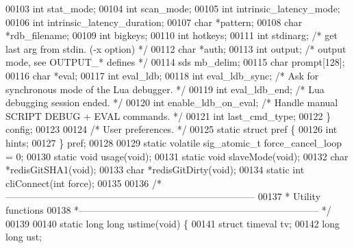\begin{DoxyCode}
00103     \textcolor{keywordtype}{int} stat\_mode;
00104     \textcolor{keywordtype}{int} scan\_mode;
00105     \textcolor{keywordtype}{int} intrinsic\_latency\_mode;
00106     \textcolor{keywordtype}{int} intrinsic\_latency\_duration;
00107     \textcolor{keywordtype}{char} *pattern;
00108     \textcolor{keywordtype}{char} *rdb\_filename;
00109     \textcolor{keywordtype}{int} bigkeys;
00110     \textcolor{keywordtype}{int} hotkeys;
00111     \textcolor{keywordtype}{int} stdinarg; \textcolor{comment}{/* get last arg from stdin. (-x option) */}
00112     \textcolor{keywordtype}{char} *auth;
00113     \textcolor{keywordtype}{int} output; \textcolor{comment}{/* output mode, see OUTPUT\_* defines */}
00114     sds mb\_delim;
00115     \textcolor{keywordtype}{char} prompt[128];
00116     \textcolor{keywordtype}{char} *eval;
00117     \textcolor{keywordtype}{int} eval\_ldb;
00118     \textcolor{keywordtype}{int} eval\_ldb\_sync;  \textcolor{comment}{/* Ask for synchronous mode of the Lua debugger. */}
00119     \textcolor{keywordtype}{int} eval\_ldb\_end;   \textcolor{comment}{/* Lua debugging session ended. */}
00120     \textcolor{keywordtype}{int} enable\_ldb\_on\_eval; \textcolor{comment}{/* Handle manual SCRIPT DEBUG + EVAL commands. */}
00121     \textcolor{keywordtype}{int} last\_cmd\_type;
00122 \} config;
00123 
00124 \textcolor{comment}{/* User preferences. */}
00125 \textcolor{keyword}{static} \textcolor{keyword}{struct} pref \{
00126     \textcolor{keywordtype}{int} hints;
00127 \} pref;
00128 
00129 \textcolor{keyword}{static} \textcolor{keyword}{volatile} sig\_atomic\_t force\_cancel\_loop = 0;
00130 \textcolor{keyword}{static} \textcolor{keywordtype}{void} usage(\textcolor{keywordtype}{void});
00131 \textcolor{keyword}{static} \textcolor{keywordtype}{void} slaveMode(\textcolor{keywordtype}{void});
00132 \textcolor{keywordtype}{char} *redisGitSHA1(\textcolor{keywordtype}{void});
00133 \textcolor{keywordtype}{char} *redisGitDirty(\textcolor{keywordtype}{void});
00134 \textcolor{keyword}{static} \textcolor{keywordtype}{int} cliConnect(\textcolor{keywordtype}{int} force);
00135 
00136 \textcolor{comment}{/*------------------------------------------------------------------------------}
00137 \textcolor{comment}{ * Utility functions}
00138 \textcolor{comment}{ *--------------------------------------------------------------------------- */}
00139 
00140 \textcolor{keyword}{static} \textcolor{keywordtype}{long} \textcolor{keywordtype}{long} ustime(\textcolor{keywordtype}{void}) \{
00141     \textcolor{keyword}{struct} timeval tv;
00142     \textcolor{keywordtype}{long} \textcolor{keywordtype}{long} ust;

\end{DoxyCode}
